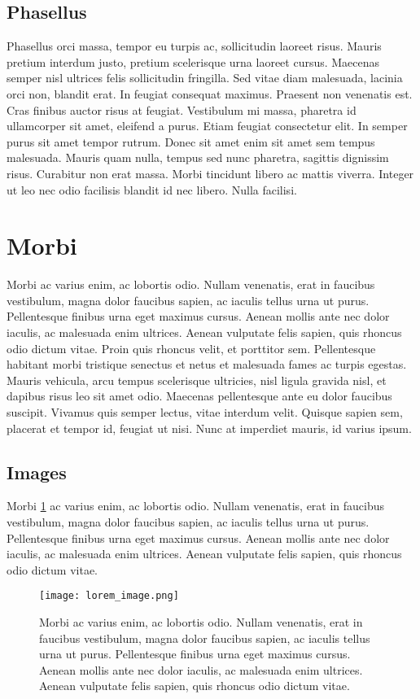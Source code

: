 \subsection{Phasellus}
Phasellus orci massa, tempor eu turpis ac, sollicitudin laoreet risus. Mauris pretium interdum justo, pretium scelerisque urna laoreet cursus. Maecenas semper nisl ultrices felis sollicitudin fringilla. Sed vitae diam malesuada, lacinia orci non, blandit erat. In feugiat consequat maximus. Praesent non venenatis est. Cras finibus auctor risus at feugiat. Vestibulum mi massa, pharetra id ullamcorper sit amet, eleifend a purus. Etiam feugiat consectetur elit. In semper purus sit amet tempor rutrum. Donec sit amet enim sit amet sem tempus malesuada. Mauris quam nulla, tempus sed nunc pharetra, sagittis dignissim risus. Curabitur non erat massa. Morbi tincidunt libero ac mattis viverra. Integer ut leo nec odio facilisis blandit id nec libero. Nulla facilisi.
\section{Morbi}
Morbi ac varius enim, ac lobortis odio. Nullam venenatis, erat in faucibus vestibulum, magna dolor faucibus sapien, ac iaculis tellus urna ut purus. Pellentesque finibus urna eget maximus cursus. Aenean mollis ante nec dolor iaculis, ac malesuada enim ultrices. Aenean vulputate felis sapien, quis rhoncus odio dictum vitae. Proin quis rhoncus velit, et porttitor sem. Pellentesque habitant morbi tristique senectus et netus et malesuada fames ac turpis egestas. Mauris vehicula, arcu tempus scelerisque ultricies, nisl ligula gravida nisl, et dapibus risus leo sit amet odio. Maecenas pellentesque ante eu dolor faucibus suscipit. Vivamus quis semper lectus, vitae interdum velit. Quisque sapien sem, placerat et tempor id, feugiat ut nisi. Nunc at imperdiet mauris, id varius ipsum.


\subsection{Images}

Morbi \ref{fig:template_cat_a} ac varius enim, ac lobortis odio. Nullam venenatis, erat in faucibus vestibulum, magna dolor faucibus sapien, ac iaculis tellus urna ut purus. Pellentesque finibus urna eget maximus cursus. Aenean mollis ante nec dolor iaculis, ac malesuada enim ultrices. Aenean vulputate felis sapien, quis rhoncus odio dictum vitae.

\begin{figure}[h!]
\texttt{[image: lorem\_image.png]} 
\centering
\caption{Morbi ac varius enim, ac lobortis odio. Nullam venenatis, erat in faucibus vestibulum, magna dolor faucibus sapien, ac iaculis tellus urna ut purus. Pellentesque finibus urna eget maximus cursus. Aenean mollis ante nec dolor iaculis, ac malesuada enim ultrices. Aenean vulputate felis sapien, quis rhoncus odio dictum vitae.}
\label{fig:template_cat_a}
\end{figure}

